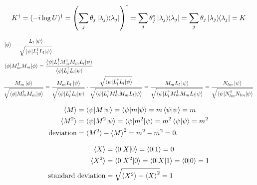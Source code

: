 \begin{align*}
	K^\dagger = (-i \log U)^\dagger = \left(\sum_j \theta_j \ket{\lambda_j}\hspace{-1mm} \bra{\lambda_j}\right)^\dagger
	= \sum_j \theta_j^* \ket{\lambda_j}\hspace{-1mm} \bra{\lambda_j} = \sum_j \theta_j \ket{\lambda_j}\hspace{-1mm} \bra{\lambda_j} = K
\end{align*}



\begin{align*}
	&\ket{\phi} \equiv \frac{L_l \ket{\psi}}{\sqrt{\braket{\psi |L_l^\dagger L_l | \psi}}}\\
	&\braket{\phi | M_m^\dagger M_m | \phi} = \frac{\braket{\psi | L_l^\dagger M_m^\dagger M_m L_l | \psi}}{\braket{\psi | L_l^\dagger L_l | \psi}} \\
%
	&\frac{M_m \ket{\phi}}{\sqrt{\braket{\phi | M_m^\dagger M_m | \phi}}} =
		\frac{M_m L_l \ket{\psi}}{\sqrt{\braket{\psi |L_l^\dagger L_l | \psi}}}
		\cdot
		\frac{ \sqrt{\braket{\psi | L_l^\dagger L_l | \psi}} }{ \sqrt{\braket{\psi | L_l^\dagger M_m^\dagger M_m L_l | \psi}} }
		=
		\frac{M_m L_l \ket{\psi}}{ \sqrt{\braket{\psi | L_l^\dagger M_m^\dagger M_m L_l | \psi}} }
		=
		\frac{N_{lm} \ket{\psi}}{\sqrt{\braket{\psi |N^\dagger_{lm}  N_{lm}  | \psi}}}
\end{align*}



\begin{align*}
	\braket{M} &= \braket{ \psi | M | \psi} = \braket{\psi | m | \psi} = m \braket{\psi | \psi} = m\\
	\braket{M^2} &= \braket{ \psi | M^2 | \psi} = \braket{\psi | m^2 | \psi} = m^2 \braket{\psi | \psi} = m^2\\
	\text{deviation} &= \braket{M^2} - \braket{M}^2 = m^2 - m^2 = 0.
\end{align*}


\begin{align*}
	\braket{X} &= \braket{0 | X | 0} = \braket{0 | 1} = 0\\
	\braket{X^2} &= \braket{0 | X^2 | 0} = \braket{0 | X | 1} =\braket{0 | 0} = 1\\
	\text{standard deviation} &= \sqrt{ \braket{X^2} - \braket{X}^2 } = 1
\end{align*}


